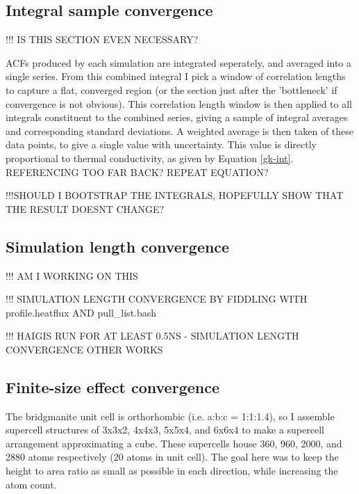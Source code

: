 \pagebreak

\subsection{\label{sec:3.GK.int}Integral sample convergence}

!!! IS THIS SECTION EVEN NECESSARY? 

ACFs produced by each simulation are integrated seperately, and averaged into a single series. 
From this combined integral I pick a window of correlation lengths to capture a flat, converged region (or the section just after the 'bottleneck' if convergence is not obvious). This correlation length window is then applied to all integrals constituent to the combined series, giving a sample of integral averages and corresponding standard deviations. A weighted average is then taken of these data points, to give a single value with uncertainty. This value is directly proportional to thermal conductivity, as given by Equation \ref{gk-int}. REFERENCING TOO FAR BACK? REPEAT EQUATION?

!!!SHOULD I BOOTSTRAP THE INTEGRALS, HOPEFULLY SHOW THAT THE RESULT DOESNT CHANGE?

\subsection{\label{sec:3.GK.sim}Simulation length convergence}

!!! AM I WORKING ON THIS

!!! SIMULATION LENGTH CONVERGENCE BY FIDDLING WITH profile.heatflux AND pull\_list.bash

!!! HAIGIS RUN FOR AT LEAST 0.5NS - SIMULATION LENGTH CONVERGENCE OTHER WORKS

\subsection{\label{sec:3.GK.fse}Finite-size effect convergence}

The bridgmanite unit cell is orthorhombic (i.e. a:b:c = 1:1:1.4), so I assemble supercell structures of 3x3x2, 4x4x3, 5x5x4, and 6x6x4 to make a supercell arrangement approximating a cube. These supercells house 360, 960, 2000, and 2880 atoms respectively (20 atoms in unit cell). The goal here was to keep the height to area ratio as small as possible in each direction, while increasing the atom count.

